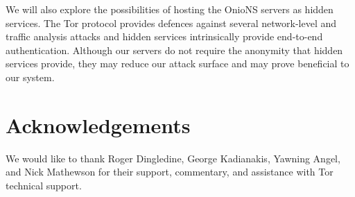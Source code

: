 \documentclass[conference]{IEEEtran}
\begin{document}
We will also explore the possibilities of hosting the OnioNS servers as hidden services. The Tor protocol provides defences against several network-level and traffic analysis attacks and hidden services intrinsically provide end-to-end authentication. Although our servers do not require the anonymity that hidden services provide, they may reduce our attack surface and may prove beneficial to our system.

\section*{Acknowledgements}

We would like to thank Roger Dingledine, George Kadianakis, Yawning Angel, and Nick Mathewson for their support, commentary, and assistance with Tor technical support.


\newpage








%
%
\end{document}
